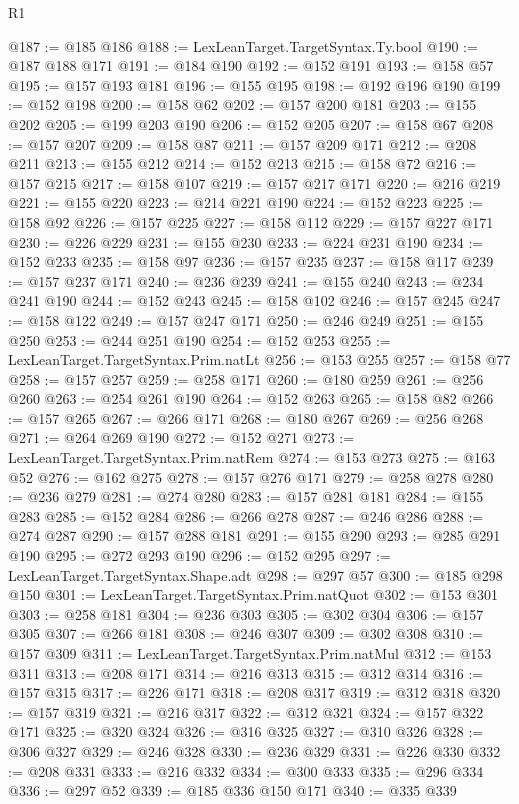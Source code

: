 \begin{lexlean}{R1}
\begin{coremodule}
@187 := @185 @186
@188 := LexLeanTarget.TargetSyntax.Ty.bool
@190 := @187 @188 @171
@191 := @184 @190
@192 := @152 @191
@193 := @158 @57
@195 := @157 @193 @181
@196 := @155 @195
@198 := @192 @196 @190
@199 := @152 @198
@200 := @158 @62
@202 := @157 @200 @181
@203 := @155 @202
@205 := @199 @203 @190
@206 := @152 @205
@207 := @158 @67
@208 := @157 @207
@209 := @158 @87
@211 := @157 @209 @171
@212 := @208 @211
@213 := @155 @212
@214 := @152 @213
@215 := @158 @72
@216 := @157 @215
@217 := @158 @107
@219 := @157 @217 @171
@220 := @216 @219
@221 := @155 @220
@223 := @214 @221 @190
@224 := @152 @223
@225 := @158 @92
@226 := @157 @225
@227 := @158 @112
@229 := @157 @227 @171
@230 := @226 @229
@231 := @155 @230
@233 := @224 @231 @190
@234 := @152 @233
@235 := @158 @97
@236 := @157 @235
@237 := @158 @117
@239 := @157 @237 @171
@240 := @236 @239
@241 := @155 @240
@243 := @234 @241 @190
@244 := @152 @243
@245 := @158 @102
@246 := @157 @245
@247 := @158 @122
@249 := @157 @247 @171
@250 := @246 @249
@251 := @155 @250
@253 := @244 @251 @190
@254 := @152 @253
@255 := LexLeanTarget.TargetSyntax.Prim.natLt
@256 := @153 @255
@257 := @158 @77
@258 := @157 @257
@259 := @258 @171
@260 := @180 @259
@261 := @256 @260
@263 := @254 @261 @190
@264 := @152 @263
@265 := @158 @82
@266 := @157 @265
@267 := @266 @171
@268 := @180 @267
@269 := @256 @268
@271 := @264 @269 @190
@272 := @152 @271
@273 := LexLeanTarget.TargetSyntax.Prim.natRem
@274 := @153 @273
@275 := @163 @52
@276 := @162 @275
@278 := @157 @276 @171
@279 := @258 @278
@280 := @236 @279
@281 := @274 @280
@283 := @157 @281 @181
@284 := @155 @283
@285 := @152 @284
@286 := @266 @278
@287 := @246 @286
@288 := @274 @287
@290 := @157 @288 @181
@291 := @155 @290
@293 := @285 @291 @190
@295 := @272 @293 @190
@296 := @152 @295
@297 := LexLeanTarget.TargetSyntax.Shape.adt
@298 := @297 @57
@300 := @185 @298 @150
@301 := LexLeanTarget.TargetSyntax.Prim.natQuot
@302 := @153 @301
@303 := @258 @181
@304 := @236 @303
@305 := @302 @304
@306 := @157 @305
@307 := @266 @181
@308 := @246 @307
@309 := @302 @308
@310 := @157 @309
@311 := LexLeanTarget.TargetSyntax.Prim.natMul
@312 := @153 @311
@313 := @208 @171
@314 := @216 @313
@315 := @312 @314
@316 := @157 @315
@317 := @226 @171
@318 := @208 @317
@319 := @312 @318
@320 := @157 @319
@321 := @216 @317
@322 := @312 @321
@324 := @157 @322 @171
@325 := @320 @324
@326 := @316 @325
@327 := @310 @326
@328 := @306 @327
@329 := @246 @328
@330 := @236 @329
@331 := @226 @330
@332 := @208 @331
@333 := @216 @332
@334 := @300 @333
@335 := @296 @334
@336 := @297 @52
@339 := @185 @336 @150 @171
@340 := @335 @339

\end{coremodule}
\end{lexlean}
